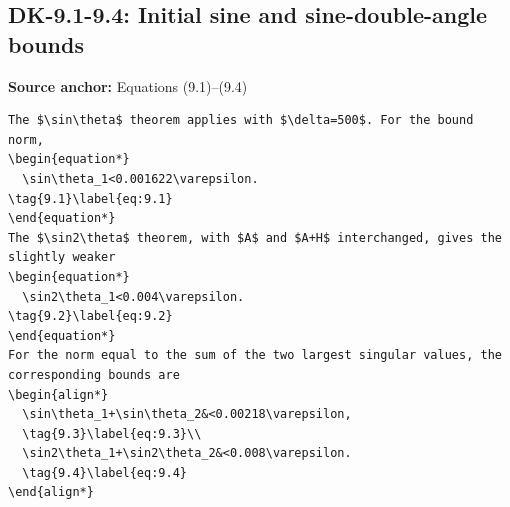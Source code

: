 \subsection*{DK-9.1-9.4: Initial sine and sine-double-angle bounds}
\noindent\textbf{Source anchor:} Equations (9.1)–(9.4)\\
\begin{verbatim}
The $\sin\theta$ theorem applies with $\delta=500$. For the bound norm,
\begin{equation*}
  \sin\theta_1<0.001622\varepsilon.
\tag{9.1}\label{eq:9.1}
\end{equation*}
The $\sin2\theta$ theorem, with $A$ and $A+H$ interchanged, gives the slightly weaker
\begin{equation*}
  \sin2\theta_1<0.004\varepsilon.
\tag{9.2}\label{eq:9.2}
\end{equation*}
For the norm equal to the sum of the two largest singular values, the corresponding bounds are
\begin{align*}
  \sin\theta_1+\sin\theta_2&<0.00218\varepsilon,
  \tag{9.3}\label{eq:9.3}\\
  \sin2\theta_1+\sin2\theta_2&<0.008\varepsilon.
  \tag{9.4}\label{eq:9.4}
\end{align*}
\end{verbatim}

